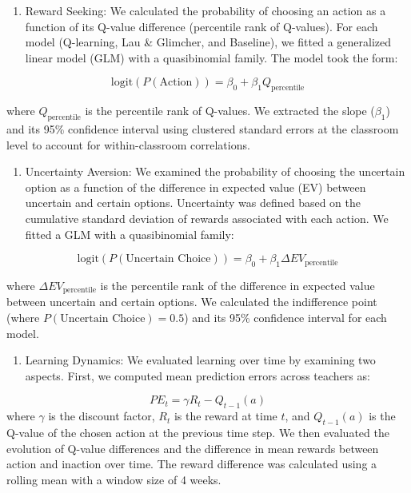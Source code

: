 \documentclass[
  number,
  preprint,
  3p,
  onecolumn]{elsarticle}
\providecommand{\tightlist}{%
  \setlength{\itemsep}{0pt}\setlength{\parskip}{0pt}}\usepackage{longtable,booktabs,array}
\begin{document}
\begin{enumerate}
\def\labelenumi{\arabic{enumi}.}
\tightlist
\item
  Reward Seeking: We calculated the probability of choosing an action as
  a function of its Q-value difference (percentile rank of Q-values).
  For each model (Q-learning, Lau \& Glimcher, and Baseline), we fitted
  a generalized linear model (GLM) with a quasibinomial family. The
  model took the form:
\end{enumerate}

\[
\text{logit}(P(\text{Action})) = \beta_0 + \beta_1 Q_\text{percentile}
\]

where \(Q_\text{percentile}\) is the percentile rank of Q-values. We
extracted the slope (\(\beta_1\)) and its 95\% confidence interval using
clustered standard errors at the classroom level to account for
within-classroom correlations.

\begin{enumerate}
\def\labelenumi{\arabic{enumi}.}
\setcounter{enumi}{1}
\tightlist
\item
  Uncertainty Aversion: We examined the probability of choosing the
  uncertain option as a function of the difference in expected value
  (EV) between uncertain and certain options. Uncertainty was defined
  based on the cumulative standard deviation of rewards associated with
  each action. We fitted a GLM with a quasibinomial family:
\end{enumerate}

\[
\text{logit}(P(\text{Uncertain Choice})) = \beta_0 + \beta_1 \Delta EV_\text{percentile}
\]

where \(\Delta EV_\text{percentile}\) is the percentile rank of the
difference in expected value between uncertain and certain options. We
calculated the indifference point (where
\(P(\text{Uncertain Choice}) = 0.5\)) and its 95\% confidence interval
for each model.

\begin{enumerate}
\def\labelenumi{\arabic{enumi}.}
\setcounter{enumi}{2}
\tightlist
\item
  Learning Dynamics: We evaluated learning over time by examining two
  aspects. First, we computed mean prediction errors across teachers as:
\end{enumerate}

\[
PE_t = \gamma R_t - Q_{t-1}(a)
\] where \(\gamma\) is the discount factor, \(R_t\) is the reward at
time \(t\), and \(Q_{t-1}(a)\) is the Q-value of the chosen action at
the previous time step. We then evaluated the evolution of Q-value
differences and the difference in mean rewards between action and
inaction over time. The reward difference was calculated using a rolling
mean with a window size of 4 weeks.
\end{document}
